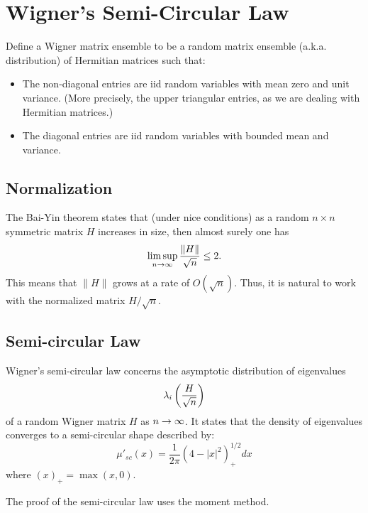 \section{Wigner's Semi-Circular Law}

Define a Wigner matrix ensemble to be a random matrix ensemble (a.k.a. distribution) of Hermitian matrices such that:
\begin{itemize}
    \item The non-diagonal entries are iid random variables with mean zero and unit variance. (More precisely, the upper triangular entries, as we are dealing with Hermitian matrices.)
    \item The diagonal entries are iid random variables with bounded mean and variance.
\end{itemize}

\subsection{Normalization}
The Bai-Yin theorem states that (under nice conditions) as a random $n \times n$ symmetric matrix $H$ increases in size, then almost surely one has
\[
    \limsup_{n \to \infty} \frac{\|H\|}{\sqrt{n}} \leq 2.
\]
This means that $\|H\|$ grows at a rate of $O(\sqrt{n})$. Thus, it is natural to work with the normalized matrix $H/\sqrt{n}$.

\subsection{Semi-circular Law}
Wigner's semi-circular law concerns the asymptotic distribution of eigenvalues
\[
    \lambda_i\left( \frac{H}{\sqrt{n}}\right)
\]
of a random Wigner matrix $H$ as $n \to \infty$. It states that the density of eigenvalues converges to a semi-circular shape described by:
\[
    \mu'_{sc}(x) = \frac{1}{2\pi}(4 - |x|^2)^{1/2}_+dx
\]
where $(x)_+ = \max(x, 0)$.

The proof of the semi-circular law uses the moment method.
